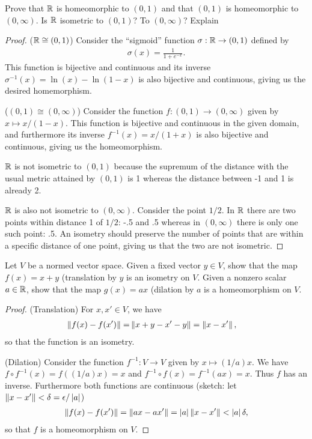\begin{exercise}{48}
Prove that $\mathbb{R}$ is homeomorphic to $(0,1)$ and that $(0,1)$ is homeomorphic to $(0,\infty)$.
Is $\mathbb{R}$ isometric to $(0,1)$?
To $(0,\infty)$?
Explain
\end{exercise}
\begin{proof}
($\mathbb{R} \cong (0,1)$)
Consider the ``sigmoid'' function $\sigma: \mathbb{R} \to (0,1)$ defined by 
\begin{align}
    \sigma(x) = \frac{1}{1+e^{-x}}.
\end{align}
This function is bijective and continuous and its inverse $\sigma^{-1}(x) = \ln(x)-\ln(1-x)$ is also bijective and continuous, giving us the desired homemorphism.

($(0,1) \cong (0,\infty)$)
Consider the function $f:(0,1)\to (0,\infty)$ given by $x\mapsto x/(1-x)$.
This function is bijective and continuous in the given domain, and furthermore its inverse $f^{-1}(x) = x/(1+x)$ is also bijective and continuous, giving us the homeomorphism.

$\mathbb{R}$ is not isometric to $(0,1)$ because the supremum of the distance with the usual metric attained by $(0,1)$ is 1 whereas the distance between -1 and 1 is already 2.

$\mathbb{R}$ is also not isometric to $(0,\infty)$.
Consider the point $1/2$.
In $\mathbb{R}$ there are two points within distance 1 of $1/2$: -.5 and .5 whereas in $(0,\infty)$ there is only one such point: .5.
An isometry should preserve the number of points that are within a specific distance of one point, giving us that the two are not isometric.
\end{proof} 

\begin{exercise}{49}
Let $V$ be a normed vector space.
Given a fixed vector $y\in V$, show that the map $f(x)=x+y$ (translation by $y$ is an isometry on $V$.
Given a nonzero scalar $a\in\mathbb{R}$, show that the map $g(x)=ax$ (dilation by $a$ is a homeomorphism on $V$.
\end{exercise}
\begin{proof}
(Translation)
For $x,x'\in V$, we have
\begin{align*}
    \left\lVert f(x)-f(x')\right\rVert
    =& \left\lVert x+y-x'-y\right\rVert
    = \left\lVert x-x'\right\rVert,
\end{align*}
so that the function is an isometry.

(Dilation)
Consider the function $f^{-1}:V\to V$ given by $x\mapsto (1/a)x$.
We have $f\circ f^{-1}(x) = f((1/a)x) = x$ and $f^{-1}\circ f(x) = f^{-1}(ax) =x$.
Thus $f$ has an inverse.
Furthermore both functions are continuous (sketch: let $\left\lVert x-x'\right\rVert<\delta=\epsilon/\left\lvert a\right\rvert$)
\begin{align*}
 \left\lVert f(x)-f(x')\right\rVert = \left\lVert ax-ax'\right\rVert = \left\lvert a\right\rvert\left\lVert x-x'\right\rVert <\left\lvert a\right\rvert\delta,
\end{align*}
so that $f$ is a homeomorphism on $V$.
\end{proof}

